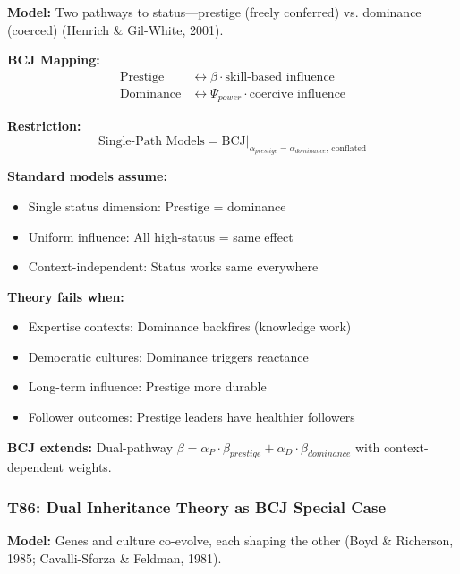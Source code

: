 \textbf{Model:} Two pathways to status---prestige (freely conferred) vs. dominance (coerced) (Henrich \& Gil-White, 2001).

\textbf{BCJ Mapping:}
\begin{align}
\text{Prestige} &\leftrightarrow \beta \cdot \text{skill-based influence} \\
\text{Dominance} &\leftrightarrow \Psi_{power} \cdot \text{coercive influence}
\end{align}

\textbf{Restriction:}
\begin{equation}
\text{Single-Path Models} = \text{BCJ} \big|_{\alpha_{prestige} = \alpha_{dominance}, \, \text{conflated}}
\end{equation}

\begin{tcolorbox}[colback=red!5!white, colframe=red!75!black,
    title=Boundary Condition: Where Unified Status Fails]
\textbf{Standard models assume:}
\begin{itemize}[nosep]
\item Single status dimension: Prestige = dominance
\item Uniform influence: All high-status = same effect
\item Context-independent: Status works same everywhere
\end{itemize}

\textbf{Theory fails when:}
\begin{itemize}[nosep]
\item Expertise contexts: Dominance backfires (knowledge work)
\item Democratic cultures: Dominance triggers reactance
\item Long-term influence: Prestige more durable
\item Follower outcomes: Prestige leaders have healthier followers
\end{itemize}

\textbf{BCJ extends:} Dual-pathway $\beta = \alpha_P \cdot \beta_{prestige} + \alpha_D \cdot \beta_{dominance}$ with context-dependent weights.
\end{tcolorbox}

\subsubsection*{T86: Dual Inheritance Theory as BCJ Special Case}

\textbf{Model:} Genes and culture co-evolve, each shaping the other (Boyd \& Richerson, 1985; Cavalli-Sforza \& Feldman, 1981).

